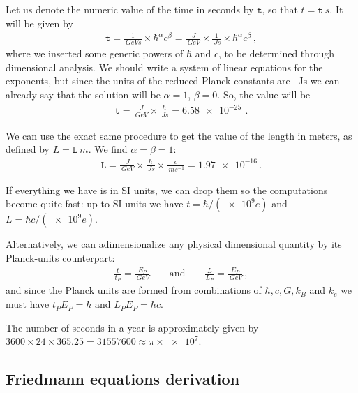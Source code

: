 \documentclass[main.tex]{subfiles}
\begin{document}
Let us denote the numeric value of the time in seconds by \(\mathtt{t}\), so that \(t = \mathtt{t} \SI{}{s}\). It will be given by 
%
\begin{align}
\mathtt{t} = \frac{1}{\SI{}{GeV s}} \times \hbar^{\alpha } c^{\beta } = \frac{\SI{}{J}}{\SI{}{GeV}} \times \frac{1}{\SI{}{Js}} \times \hbar^{\alpha } c^{\beta }  
\,,
\end{align}
%
where we inserted some generic powers of \(\hbar\) and \(c\), to be determined through dimensional analysis.
We should write a system of linear equations for the exponents, but since the units of the reduced Planck constants are \SI{}{Js} we can already say that the solution will be \(\alpha = 1\), \(\beta =0\). 
So, the value will be 
%
\begin{align}
\mathtt{t}  = \frac{\SI{}{J}}{\SI{}{GeV}} \times \frac{\hbar}{\SI{}{Js}} = \SI{6.58e-25}{}
\,.
\end{align}

We can use the exact same procedure to get the value of the length in meters, as defined by \(L = \mathtt{L} \SI{}{m}\). We find \(\alpha = \beta = 1\): 
%
\begin{align}
\mathtt{L} = \frac{\SI{}{J}}{\SI{}{GeV}} 
\times \frac{\hbar}{\SI{}{Js}} \times \frac{c }{\SI{}{m s^{-1}}} = \num{1.97e-16}
\,.
\end{align}

If everything we have is in SI units, we can drop them so the computations become quite fast: up to SI units we have \(t  = \hbar / (\num{e9}e) \) and \(L = \hbar c / (\num{e9} e)\).

Alternatively, we can adimensionalize any physical dimensional quantity by its Planck-units counterpart: 
%
\begin{align}
\frac{t}{t_P} = \frac{E_P}{\SI{}{GeV}} \qquad \text{and} \qquad \frac{L}{L_P} = \frac{E_P}{\SI{}{GeV}}
\,,
\end{align}
%
and since the Planck units are formed from combinations of \(\hbar, c, G, k_B\) and \(k_e\) we must have \(t_P E_P = \hbar\) and \(L_P E_P = \hbar c\). 

The number of seconds in a year is approximately given by \(3600 \times 24 \times 365.25 = 31557600 \approx \pi \times \num{e7}\).

\subsection{Friedmann equations derivation}

\end{document}
